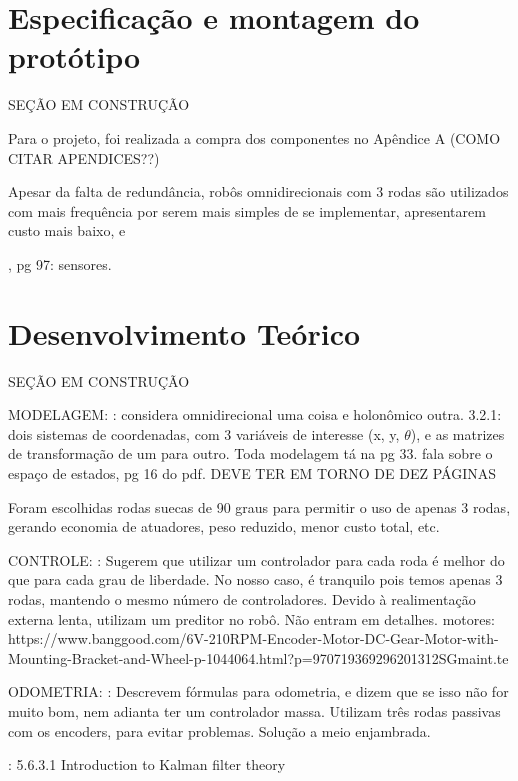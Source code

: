 \section{Especificação e montagem do protótipo}
\label{sec:montagem}

SEÇÃO EM CONSTRUÇÃO

Para o projeto, foi realizada a compra dos componentes no Apêndice A (COMO CITAR APENDICES??)

Apesar da falta de redundância, robôs omnidirecionais com 3 rodas são utilizados com mais frequência por serem mais simples de se implementar, apresentarem custo mais baixo, e

\cite{siegwart2011introduction}, pg 97: sensores.

\section{Desenvolvimento Teórico}
\label{sec:teorico}

SEÇÃO EM CONSTRUÇÃO

MODELAGEM: \cite{siegwart2011introduction}: considera omnidirecional uma coisa e holonômico outra. 3.2.1: dois sistemas de coordenadas, com 3 variáveis de interesse (x, y, $\theta$), e as matrizes de transformação de um para outro. Toda modelagem tá na pg 33.
\cite{spong2005robot} fala sobre o espaço de estados, pg 16 do pdf.
DEVE TER EM TORNO DE DEZ PÁGINAS

Foram escolhidas rodas suecas de 90 graus para permitir o uso de apenas 3 rodas, gerando economia de atuadores, peso reduzido, menor custo total, etc.

 CONTROLE:
 \cite{rojas2006holonomic}: Sugerem que utilizar um controlador para cada roda é melhor do que para cada grau de liberdade. No nosso caso, é tranquilo pois temos apenas 3 rodas, mantendo o mesmo número de controladores. Devido à realimentação externa lenta, utilizam um preditor no robô. Não entram em detalhes.
motores:
https://www.banggood.com/6V-210RPM-Encoder-Motor-DC-Gear-Motor-with-Mounting-Bracket-and-Wheel-p-1044064.html?p=970719369296201312SGmaint.te

ODOMETRIA:
\cite{samani2007comprehensive}: Descrevem fórmulas para odometria, e dizem que se isso não for muito bom, nem adianta ter um controlador massa. Utilizam três rodas passivas com os encoders, para evitar problemas. Solução a meio enjambrada.

\cite{siegwart2011introduction}: 5.6.3.1 Introduction to Kalman filter theory


